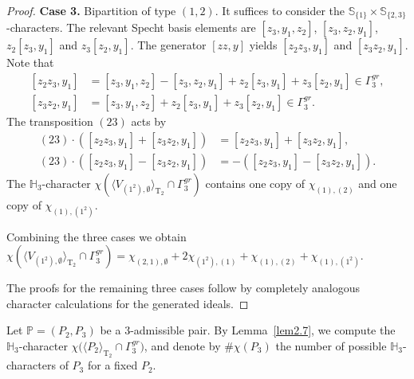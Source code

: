\documentclass{amsart}
\theoremstyle{definition}
\theoremstyle{remark}
\numberwithin{equation}{section}
\newcommand{\lr}[1]{\langle #1 \rangle}
\def \Ga{\Gamma}
\def \H{\mathbb{H}}
\def \P{\mathbb{P}}
\def \S{\mathbb{S}}
\def \T{\operatorname{T}}
\def \es{\emptyset}
\begin{document}
\begin{proof}
	\textbf{Case 3.} Bipartition of type $(1,2)$. It suffices to consider the $\S_{\{1\}} \times \S_{\{2,3\}}$-characters. The relevant Specht basis elements are $[z_3,y_1,z_2]$, $[z_3,z_2,y_1]$, $z_2[z_3,y_1]$ and $z_3[z_2,y_1]$. The generator $[zz,y]$ yields $[z_2z_3,y_1]$ and $[z_3z_2,y_1]$. Note that
	\begin{equation*}
		\begin{split}
		[z_2z_3,y_1]&=[z_3,y_1,z_2]-[z_3,z_2,y_1]+z_2[z_3,y_1]+z_3[z_2,y_1] \in \Ga_3^{gr}, \\
		[z_3z_2,y_1]&=[z_3,y_1,z_2]+z_2[z_3,y_1]+z_3[z_2,y_1] \in \Ga_3^{gr}.
		\end{split}
	\end{equation*}
	The transposition $(23)$ acts by
	\begin{equation*}
		\begin{split}
		(23)\cdot([z_2z_3,y_1]+[z_3z_2,y_1])&=[z_2z_3,y_1]+[z_3z_2,y_1], \\
		(23)\cdot([z_2z_3,y_1]-[z_3z_2,y_1])&=-([z_2z_3,y_1]-[z_3z_2,y_1]).
		\end{split}
	\end{equation*}
	The $\H_3$-character $\chi(\lr{V_{(1^2), \es}}_{\T_2} \cap \Ga_3^{gr})$ contains one copy of $\chi_{(1),(2)}$ and one copy of $\chi_{(1),(1^2)}$.
	
	Combining the three cases we obtain  $\chi({\lr{V_{(1^2), \es}}_{\T_2} \cap \Ga_3^{gr}}) = \chi_{(2,1),\es} + 2\chi_{(1^2),(1)} + \chi_{(1),(2)} + \chi_{(1),(1^2)}$.

	The proofs for the remaining three cases follow by completely analogous character calculations for the generated ideals.
\end{proof}	
	
	Let $\P=(P_2, P_3)$ be a $3$-admissible pair. By Lemma~\ref{lem2.7}, we compute the $\H_3$-character $\chi\bigl( \langle P_2 \rangle_{\T_2} \cap \Ga_3^{gr} \bigr)$, and denote by $\#\chi(P_3)$ the number of possible $\H_3$-characters of $P_3$ for a fixed $P_2$.
	
\end{document}
